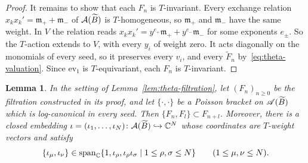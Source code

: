 \documentclass[12pt, letter]{amsart}
\newtheorem{lemma}[dummy]{Lemma}
\theoremstyle{definition}
\begin{document}
\begin{proof}
It remains to show that each $F_n$ is $T$-invariant.
Every exchange relation $x_kx_k'=\mathfrak m_++\mathfrak m_-$ of $\mathcal{A}(\widetilde B)$ is $T$-homogeneous, so $\mathfrak m_+$ and $\mathfrak m_-$ have the same weight.
In $V$ the relation reads $x_kx_k'=y^{e_+}\mathfrak m_++y^{e_-}\mathfrak m_-$ for some exponents $e_\pm$.
So the $T$-action extends to $V$, with every $y_i$ of weight zero.
It acts diagonally on the monomials of every seed, so it preserves every $v_i$, and every $\widetilde F_n$ by~\eqref{eq:theta-valuation}.
Since $\mathrm{ev}_1$ is $T$-equivariant, each $F_n$ is $T$-invariant.
\end{proof}

\begin{lemma}\label{lem:quadratic-growth}
In the setting of Lemma~\ref{lem:theta-filtration}, let $(F_n)_{n\ge0}$ be the filtration constructed in its proof, and let $\{\cdot,\cdot\}$ be a Poisson bracket on $\mathscr{A}(\widetilde B)$ which is log-canonical in every seed.
Then $\{F_n,F_l\}\subset F_{n+l}$.
Moreover, there is a closed embedding $\iota=(\iota_1,\dots,\iota_N)\colon\mathcal{A}(\widetilde B)\hookrightarrow\mathbb{C}^N$ whose coordinates are $T$-weight vectors and satisfy
\[
 \{\iota_\mu,\iota_\nu\}\in\operatorname{span}_{\mathbb{C}}\{1,\iota_\rho,\iota_\rho \iota_\sigma\mid 1\le\rho,\sigma\le N\}\qquad(1\le\mu,\nu\le N).
\]
\end{lemma}
\end{document}
